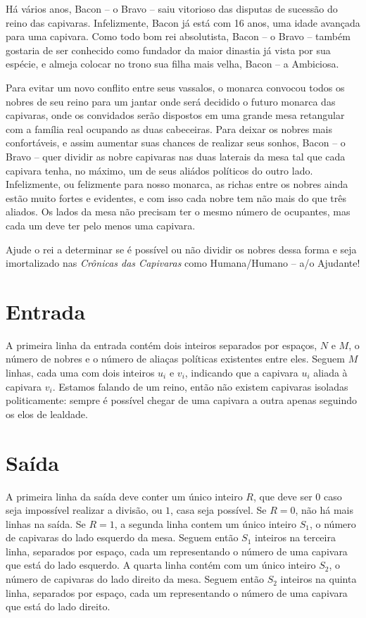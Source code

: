 Há vários anos, Bacon -- o Bravo -- saiu vitorioso das disputas de sucessão do reino das capivaras.
Infelizmente, Bacon já está com 16 anos, uma idade avançada para uma capivara.
Como todo bom rei absolutista, Bacon -- o Bravo -- também gostaria de ser conhecido como fundador
da maior dinastia já vista por sua espécie, e almeja colocar no trono sua filha mais velha,
Bacon -- a Ambiciosa.

Para evitar um novo conflito entre seus vassalos, o monarca convocou todos os nobres de seu reino
para um jantar onde será decidido o futuro monarca das capivaras, onde os convidados serão dispostos em uma
grande mesa retangular com a família real ocupando as duas cabeceiras.
Para deixar os nobres mais confortáveis, e assim aumentar suas chances de realizar seus sonhos,
Bacon -- o Bravo -- quer dividir as nobre capivaras nas duas laterais da mesa tal que cada capivara tenha,
no máximo, um de seus aliádos políticos do outro lado.
Infelizmente, ou felizmente para nosso monarca, as richas entre os nobres ainda estão muito fortes e evidentes,
e com isso cada nobre tem não mais do que três aliados.
Os lados da mesa não precisam ter o mesmo número de ocupantes, mas cada um deve ter pelo menos uma capivara.

Ajude o rei a determinar se é possível ou não dividir os nobres dessa forma e seja imortalizado nas 
\textit{Crônicas das Capivaras} como Humana/Humano -- a/o Ajudante!

\section*{Entrada}

A primeira linha da entrada contém dois inteiros separados por espaços, $N$ e $M$, o número de nobres e o número
de aliaças políticas existentes entre eles.
Seguem $M$ linhas, cada uma com dois inteiros $u_i$ e $v_i$, indicando que a capivara $u_i$ aliada à capivara $v_i$.
Estamos falando de um reino, então não existem capivaras isoladas politicamente: sempre é possível chegar de uma capivara
a outra apenas seguindo os elos de lealdade.

\section*{Saída}

A primeira linha da saída deve conter um único inteiro $R$, que deve ser $0$ caso seja impossível realizar a divisão,
ou $1$, casa seja possível.
Se $R = 0$, não há mais linhas na saída.
Se $R = 1$, a segunda linha contem um único inteiro $S_1$, o número de capivaras do lado esquerdo da mesa.
Seguem então $S_1$ inteiros na terceira linha, separados por espaço, cada um representando o número de uma capivara que está do lado esquerdo.
A quarta linha contém com um único inteiro $S_2$, o número de capivaras do lado direito da mesa.
Seguem então $S_2$ inteiros na quinta linha, separados por espaço, cada um representando o número de uma capivara que está do lado direito.


